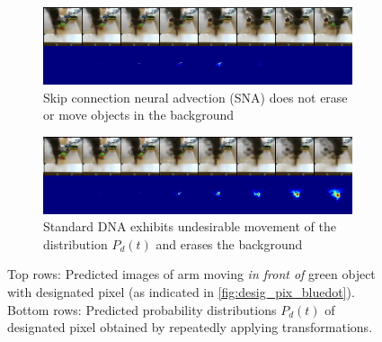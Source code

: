 \begin{figure}
    \centering
    \begin{subfigure}{0.9\columnwidth}
    \centering
        \includegraphics[width=1.\linewidth]{images_sna/occlusionaware/cdna_1ststep_bckgd_gen_pixb0_overtime.png}
        \caption{Skip connection neural advection (SNA) does not erase or move objects in the background}
        \label{fig:Ng1}
    \end{subfigure}
    \begin{subfigure}{0.9\columnwidth}
    \centering
        \includegraphics[width=1.0\linewidth]{images_sna/occlusionaware/orig_dna_gen_pixb0_overtime.png}
        \caption{Standard DNA \cite{foresight} exhibits undesirable movement of the distribution $P_{d}(t)$ and erases the background}
    \end{subfigure}
    \caption{
    Top rows: Predicted images of arm moving \textit{in front of} green object with designated pixel (as indicated in \autoref{fig:desig_pix_bluedot}). 
    Bottom rows: Predicted probability distributions $P_{d}(t)$ of designated pixel obtained by repeatedly applying transformations.}
    \label{fig:pix_reappear}
\end{figure}
